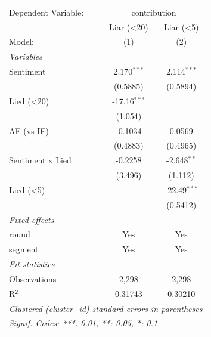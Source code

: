 
\begingroup
\centering
\begin{tabular}{lcc}
   \tabularnewline \midrule \midrule
   Dependent Variable: & \multicolumn{2}{c}{contribution}\\
                    & Liar (<20)     & Liar (<5) \\   
   Model:           & (1)            & (2)\\  
   \midrule
   \emph{Variables}\\
   Sentiment        & 2.170$^{***}$  & 2.114$^{***}$\\   
                    & (0.5885)       & (0.5894)\\   
   Lied (<20)       & -17.16$^{***}$ &   \\   
                    & (1.054)        &   \\   
   AF (vs IF)       & -0.1034        & 0.0569\\
                    & (0.4883)       & (0.4965)\\   
   Sentiment x Lied & -0.2258        & -2.648$^{**}$\\   
                    & (3.496)        & (1.112)\\   
   Lied (<5)        &                & -22.49$^{***}$\\   
                    &                & (0.5412)\\   
   \midrule
   \emph{Fixed-effects}\\
   round            & Yes            & Yes\\  
   segment          & Yes            & Yes\\  
   \midrule
   \emph{Fit statistics}\\
   Observations     & 2,298          & 2,298\\  
   R$^2$            & 0.31743        & 0.30210\\  
   \midrule \midrule
   \multicolumn{3}{l}{\emph{Clustered (cluster\_id) standard-errors in parentheses}}\\
   \multicolumn{3}{l}{\emph{Signif. Codes: ***: 0.01, **: 0.05, *: 0.1}}\\
\end{tabular}
\par\endgroup


